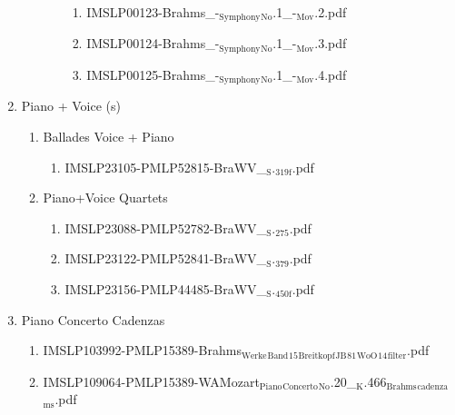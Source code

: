 \documentclass[11pt]{article}
\begin{document}
\begin{enumerate}
\begin{enumerate}
\begin{enumerate}
\begin{enumerate}
\item IMSLP00123-Brahms\_-$_{\text{Symphony}}$$_{\text{No}}$.1\_-$_{\text{Mov}}$.2.pdf
\label{sec-1-1-1-1-44-15-3-2-6-2}

\item IMSLP00124-Brahms\_-$_{\text{Symphony}}$$_{\text{No}}$.1\_-$_{\text{Mov}}$.3.pdf
\label{sec-1-1-1-1-44-15-3-2-6-3}

\item IMSLP00125-Brahms\_-$_{\text{Symphony}}$$_{\text{No}}$.1\_-$_{\text{Mov}}$.4.pdf
\label{sec-1-1-1-1-44-15-3-2-6-4}
\end{enumerate}
\end{enumerate}
\end{enumerate}

\item Piano + Voice (s)
\label{sec-1-1-1-1-44-15-4}
\begin{enumerate}
\item Ballades Voice + Piano
\label{sec-1-1-1-1-44-15-4-1}
\begin{enumerate}
\item IMSLP23105-PMLP52815-BraWV\_$_{\text{S}}$.$_{\text{319f}}$.pdf
\label{sec-1-1-1-1-44-15-4-1-1}
\end{enumerate}

\item Piano+Voice Quartets
\label{sec-1-1-1-1-44-15-4-2}
\begin{enumerate}
\item IMSLP23088-PMLP52782-BraWV\_$_{\text{S}}$.$_{\text{275}}$.pdf
\label{sec-1-1-1-1-44-15-4-2-1}

\item IMSLP23122-PMLP52841-BraWV\_$_{\text{S}}$.$_{\text{379}}$.pdf
\label{sec-1-1-1-1-44-15-4-2-2}

\item IMSLP23156-PMLP44485-BraWV\_$_{\text{S}}$.$_{\text{450f}}$.pdf
\label{sec-1-1-1-1-44-15-4-2-3}
\end{enumerate}
\end{enumerate}

\item Piano Concerto Cadenzas
\label{sec-1-1-1-1-44-15-5}
\begin{enumerate}
\item IMSLP103992-PMLP15389-Brahms$_{\text{Werke}}$$_{\text{Band}}$$_{\text{15}}$$_{\text{Breitkopf}}$$_{\text{JB}}$$_{\text{81}}$$_{\text{WoO}}$$_{\text{14}}$$_{\text{filter}}$.pdf
\label{sec-1-1-1-1-44-15-5-1}

\item IMSLP109064-PMLP15389-WAMozart$_{\text{Piano}}$$_{\text{Concerto}}$$_{\text{No}}$.20\_$_{\text{K}}$.466$_{\text{Brahms}}$$_{\text{cadenza}}$$_{\text{ms}}$.pdf
\label{sec-1-1-1-1-44-15-5-2}
\end{enumerate}


\end{enumerate}
\end{document}
